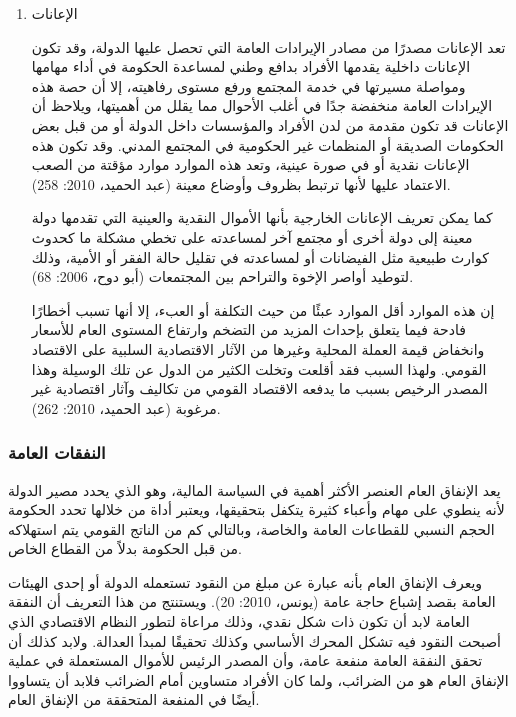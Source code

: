 \documentclass[10pt,a4paper]{report}
\begin{document}
\begin{doublespacing}
\begin{enumerate}
وتلجأ الدولة لعقد القروض الخارجية عندما تكون السوق المالية الداخلية عاجزة عن توفير الأموال اللازمة لتغطية مبلغ القرض، كذلك عندما تعاني من عجز في مدفوعاتها الخارجية وتحتاج إلى عملات أجنبية لسد هذا العجز (يونس، 2004: 85).
\item الإعانات


تعد الإعانات مصدرًا من مصادر الإيرادات العامة التي تحصل عليها الدولة، وقد تكون الإعانات داخلية يقدمها الأفراد بدافع وطني لمساعدة الحكومة في أداء مهامها ومواصلة مسيرتها في خدمة المجتمع ورفع مستوى رفاهيته، إلا أن حصة هذه الإيرادات العامة منخفضة جدًا في أغلب الأحوال مما يقلل من أهميتها، ويلاحظ أن الإعانات قد تكون مقدمة من لدن الأفراد والمؤسسات داخل الدولة أو من قبل بعض الحكومات الصديقة أو المنظمات غير الحكومية في المجتمع المدني. وقد تكون هذه الإعانات نقدية أو في صورة عينية، وتعد هذه الموارد موارد مؤقتة من الصعب الاعتماد عليها لأنها ترتبط بظروف وأوضاع معينة (عبد الحميد، 2010: 258). 

كما يمكن تعريف الإعانات الخارجية بأنها الأموال النقدية والعينية التي تقدمها دولة معينة إلى دولة أخرى أو مجتمع آخر لمساعدته على تخطي مشكلة ما كحدوث كوارث طبيعية مثل الفيضانات أو لمساعدته في تقليل حالة الفقر أو الأمية، وذلك لتوطيد أواصر الإخوة والتراحم بين المجتمعات (أبو دوح، 2006: 68). 

إن هذه الموارد أقل الموارد عبئًا من حيث التكلفة أو العبء، إلا أنها تسبب أخطارًا فادحة فيما يتعلق بإحداث المزيد من التضخم وارتفاع المستوى العام للأسعار وانخفاض قيمة العملة المحلية وغيرها من الآثار الاقتصادية السلبية على الاقتصاد القومي. ولهذا السبب فقد أقلعت وتخلت الكثير من الدول عن تلك الوسيلة وهذا المصدر الرخيص بسبب ما يدفعه الاقتصاد القومي من تكاليف وآثار اقتصادية غير مرغوبة (عبد الحميد، 2010: 262).
\end{enumerate} 
\subsubsection{النفقات العامة}
يعد الإنفاق العام العنصر الأكثر أهمية في السياسة المالية، وهو الذي يحدد مصير الدولة لأنه ينطوي على مهام وأعباء كثيرة يتكفل بتحقيقها، ويعتبر أداة من خلالها تحدد الحكومة الحجم النسبي للقطاعات العامة والخاصة، وبالتالي كم من الناتج القومي يتم استهلاكه من قبل الحكومة بدلاً من القطاع الخاص. 

ويعرف الإنفاق العام بأنه عبارة عن مبلغ من النقود تستعمله الدولة أو إحدى الهيئات العامة بقصد إشباع حاجة عامة (يونس، 2010: 20). ويستنتج من هذا التعريف أن النفقة العامة لابد أن تكون ذات شكل نقدي، وذلك مراعاة لتطور النظام الاقتصادي الذي أصبحت النقود فيه تشكل المحرك الأساسي وكذلك تحقيقًا لمبدأ العدالة. ولابد كذلك أن تحقق النفقة العامة منفعة عامة، وأن المصدر الرئيس للأموال المستعملة في عملية الإنفاق العام هو من الضرائب، ولما كان الأفراد متساوين أمام الضرائب فلابد أن يتساووا أيضًا في المنفعة المتحققة من الإنفاق العام. 


\end{doublespacing}
\end{document}
